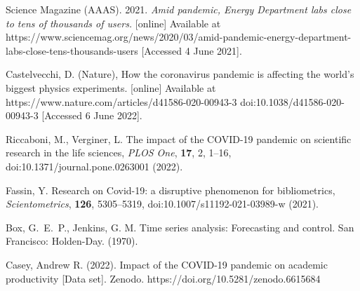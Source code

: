 \documentclass[]{rsos}%
\begin{document}
\begin{thebibliography}{10}
Science Magazine (AAAS). 2021. \emph{Amid pandemic, Energy Department labs close to tens of thousands of users.} [online] Available at {https://www.sciencemag.org/news/2020/03/amid-pandemic-energy-department-labs-close-tens-thousands-users} [Accessed 4 June 2021].

Castelvecchi, D. (Nature), {How the coronavirus pandemic is affecting the world's biggest physics experiments.} [online] Available at {https://www.nature.com/articles/d41586-020-00943-3} doi:10.1038/d41586-020-00943-3 [Accessed 6 June 2022].

Riccaboni, M., Verginer, L. {The impact of the COVID-19 pandemic on scientific research in the life sciences}, \emph{PLOS One}, \textbf{17}, 2, 1--16, doi:10.1371/journal.pone.0263001 \newblock (2022).

{Fassin, Y.} {Research on Covid-19: a disruptive phenomenon for bibliometrics}, \emph{Scientometrics}, \textbf{126}, 5305--5319, doi:10.1007/s11192-021-03989-w \newblock (2021).

{Box, G.~E.~P., Jenkins, G. M.} Time series analysis: Forecasting and control. San Francisco: Holden-Day. \newblock (1970).

 Casey, Andrew R. (2022). Impact of the COVID-19 pandemic on academic productivity [Data set]. Zenodo. https://doi.org/10.5281/zenodo.6615684

\end{thebibliography}
\end{document}
